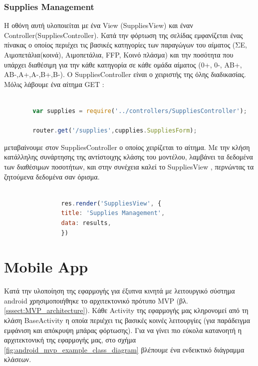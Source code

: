 		\subsubsection{Supplies Management}
		
	Η οθόνη αυτή υλοποιείται με ένα View (SuppliesView) και έναν Controller(SuppliesController). Κατά την φόρτωση της σελίδας εμφανίζεται ένας πίνακας ο οποίος περιέχει τις βασικές κατηγορίες των παραγώγων του αίματος (ΣΕ, Αιμοπετάλια(κοινά), Αιμοπετάλια, FFP, Κοινό πλάσμα) και την ποσότητα που υπάρχει διαθέσιμη για την κάθε κατηγορία σε κάθε ομάδα αίματος (0+, 0-, ΑΒ+, ΑΒ-,Α+,Α-,Β+,Β-). O SuppliesController είναι ο χειριστής της όλης διαδικασίας. Μόλις λάβουμε ένα αίτημα GET :
		
		\begin{lstlisting}[language=Javascript]			
		
		var supplies = require('../controllers/SuppliesController');
		
		router.get('/supplies',cupplies.SuppliesForm);  


		\end{lstlisting}
		
μεταβαίνουμε στον SuppliesController ο οποίος χειρίζεται το αίτημα. Με την κλήση κατάλληλης συνάρτησης της αντίστοιχης κλάσης του μοντέλου, λαμβάνει τα δεδομένα των διαθέσιμων ποσοτήτων,  και στην συνέχεια καλεί το SuppliesView , περνώντας τα ζητούμενα δεδομένα σαν όρισμα.



		\begin{lstlisting}[language=Javascript]			
		
	            res.render('SuppliesView', { 
                title: 'Supplies Management',
                data: results,
				})

		\end{lstlisting}
	

\section{Mobile App}
	Κατά την υλοποίηση της εφαρμογής για έξυπνα κινητά με λειτουργικό σύστημα android χρησιμοποιήθηκε το αρχιτεκτονικό πρότυπο MVP (βλ. \ref{sssect:MVP_architecture}). Κάθε Activity της εφαρμογής μας κληρονομεί από τη κλάση BaseActivity η οποία περιέχει τις βασικές κοινές λειτουργίες (για παράδειγμα εμφάνιση και απόκρυψη μπάρας φόρτωσης). Για να γίνει πιο εύκολα κατανοητή η αρχιτεκτονική της εφαρμογής μας, στο σχήμα \ref{fig:android_mvp_example_class_diagram} βλέπουμε ένα ενδεικτικό διάγραμμα κλάσεων.
	

